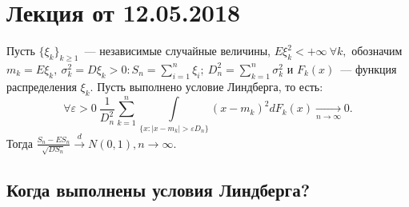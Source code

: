 
	\section{Лекция от 12.05.2018}
	\begin{theorem}[Линдберга][б/д]
		Пусть \(\{\xi_k\}_{k \geqslant 1}\)~--- независимые случайные величины, \(E\xi_k^2 < +\infty ~ \forall k,\) обозначим \(m_k = E\xi_k, ~\sigma^2_k = D\xi_k > 0: S_n = \sum\limits_{i = 1}^{n}\xi_i; ~ D_n^2 = \sum\limits_{k = 1}^{n}\sigma^2_k\) и \(F_k(x)\)~--- функция распределения \(\xi_k\). Пусть выполнено условие Линдберга, то есть:
		\[
			\forall \varepsilon > 0 ~ \frac{1}{D^2_n} \sum\limits_{k = 1}^{n} \int\limits_{\{x:|x - m_k| > \varepsilon D_n\}}(x-m_k)^2 dF_k(x) \underset{n \to \infty}{\longrightarrow} 0.
		\]
		Тогда \( \frac{S_n - ES_n}{\sqrt{DS_n}} \overset{d}{\longrightarrow} N(0,1), n\to \infty\).
	\end{theorem}

	\subsection{Когда выполнены условия Линдберга?}

